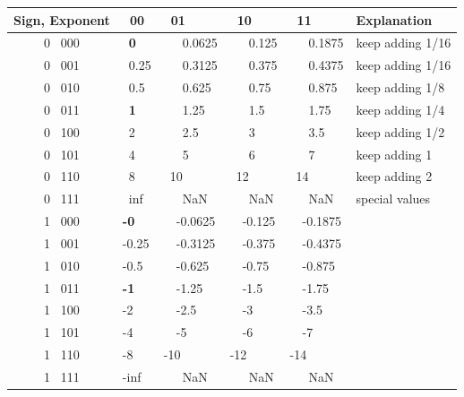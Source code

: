 \documentclass[aspectratio=169,xcolor=pdftex,dvipsnames]{beamer} %
\begin{document}
\begin{frame}

\begin{center}
\begin{tabular}{ | c || l | l | l | l | l |}
\hline
Sign, Exponent & \ 00 & \ 01 & \ 10 & \ 11 & Explanation\\ \hline 
\hline
0 \ 000 & \ \textbf{0} &\ \ \ 0.0625 &\ \ \ 0.125 &\ \ \ 0.1875 & keep adding 1/16 \\ \hline
0 \ 001 & \ 0.25 &\ \ \ 0.3125 &\ \ \ 0.375 &\ \ \ 0.4375 & keep adding 1/16 \\ 
0 \ 010 & \ 0.5 &\ \ \ 0.625 &\ \ \ 0.75 &\ \ \ 0.875 & keep adding 1/8 \\ 
0 \ 011 & \ \textbf{1} &\ \ \ 1.25 &\ \ \ 1.5 &\ \ \ 1.75 & keep adding 1/4 \\ 
0 \ 100 & \ 2 &\ \ \ 2.5 &\ \ \ 3 &\ \ \ 3.5 & keep adding 1/2 \\ 
0 \  101 & \ 4 &\ \ \ 5 &\ \ \ 6 &\ \ \ 7 & keep adding 1 \\ 
0 \ 110 & \ 8 & \ 10 & \ 12 & \ 14 & keep adding 2 \\ \hline
0 \ 111 & \ inf &\ \ \  NaN &\ \ \  NaN &\ \ \ NaN & special values \\ \hline

1 \ 000 & \textbf{-0} &\ \ -0.0625 &\ \ -0.125 &\ \ -0.1875 & \\ \hline
1 \ 001 & -0.25 &\ \ -0.3125 &\ \ -0.375 &\ \ -0.4375 & \\ 
1 \ 010 & -0.5 &\ \ -0.625 &\ \ -0.75 &\ \ -0.875 & \\ 
1 \ 011 & \textbf{-1} &\ \ -1.25 &\ \ -1.5 &\ \ -1.75 & \\ 
1 \ 100 & -2 &\ \ -2.5 &\ \ -3 &\ \ -3.5 & \\ 
1 \ 101 & -4 &\ \ -5 &\ \ -6 &\ \ -7 & \\ 
1 \ 110 & -8 & -10 & -12 & -14 & \\ \hline
1 \ 111 & -inf &\ \ \  NaN &\ \ \  NaN &\ \ \  NaN &  \\ \hline
\end{tabular}
\end{center}

\end{frame}

\end{document}
